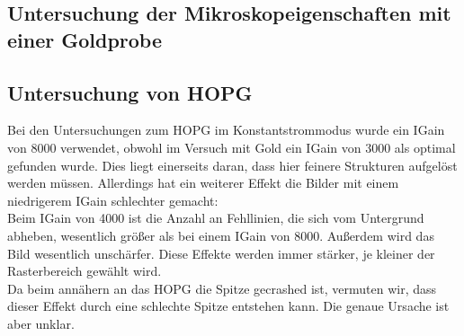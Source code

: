\documentclass[12pt,a4paper]{article}
\begin{document}
\subsection{Untersuchung der Mikroskopeigenschaften mit einer Goldprobe}

\subsection{Untersuchung von HOPG}
Bei den Untersuchungen zum HOPG im Konstantstrommodus wurde ein IGain von 8000 verwendet, obwohl im Versuch mit Gold ein IGain von 3000 als optimal gefunden wurde. Dies liegt einerseits daran, dass hier feinere Strukturen aufgelöst werden müssen. Allerdings hat ein weiterer Effekt die Bilder mit einem niedrigerem IGain schlechter gemacht:\\
Beim IGain von 4000 ist die Anzahl an Fehllinien, die sich vom Untergrund abheben, wesentlich größer als bei einem IGain von 8000. Außerdem wird das Bild wesentlich unschärfer. Diese Effekte werden immer stärker, je kleiner der Rasterbereich gewählt wird.\\
Da beim annähern an das HOPG die Spitze gecrashed ist, vermuten wir, dass dieser Effekt durch eine schlechte Spitze entstehen kann. Die genaue Ursache ist aber unklar.\\
\\
\end{document}

